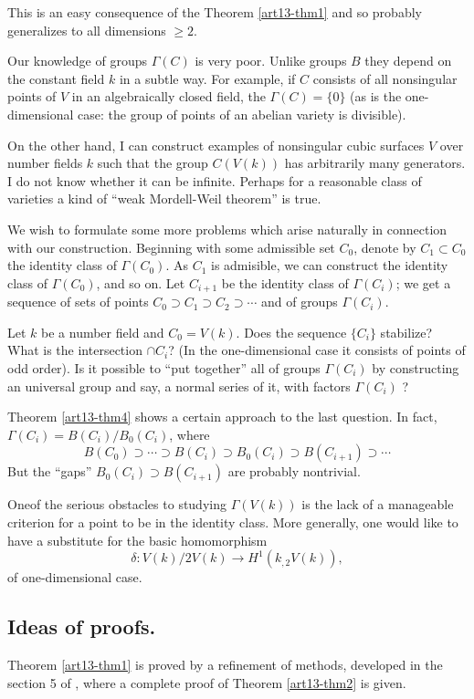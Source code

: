 This is an easy consequence of the Theorem \ref{art13-thm1} and so probably generalizes to all dimensions $\geq 2$.

Our knowledge of groups $\Gamma(C)$ is very poor. Unlike groups $B$ they depend on the constant field $k$ in a subtle way. For example, if $C$ consists of all nonsingular points of $V$ in an algebraically closed field, the $\Gamma(C)=\{0\}$ (as is the one-dimensional case: the group of points of an abelian variety is divisible).

On the other hand, I can construct examples of nonsingular cubic surfaces $V$ over number fields $k$ such that the group $C(V(k))$ has arbitrarily many generators. I do not know whether it can be infinite. Perhaps for a reasonable class of varieties a kind of ``weak Mordell-Weil theorem'' is true.

We wish to formulate some more problems which arise naturally in connection with our construction. Beginning with some admissible set $C_{0}$, denote by $C_{1}\subset C_{0}$ the identity class of $\Gamma(C_{0})$. As $C_{1}$ is admisible, we can construct the identity class of $\Gamma(C_{0})$, and so on. Let $C_{i+1}$ be the identity class of $\Gamma(C_{i})$; we get a sequence of sets of points $C_{0}\supset C_{1}\supset C_{2}\supset \cdots$ and of groups $\Gamma(C_{i})$.

Let $k$ be a number field and $C_{0}=V(k)$. Does the sequence $\{C_{i}\}$ stabilize? What is the intersection $\cap C_{i}$? (In the one-dimensional case it consists of points of odd order). Is it possible to ``put together'' all of groups $\Gamma(C_{i})$ by constructing an universal group and say, a normal series of it, with factors $\Gamma(C_{i})$ ?

Theorem \ref{art13-thm4} shows a certain approach to the last question. In fact, $\Gamma(C_{i})=B(C_{i})/B_{0}(C_{i})$, where
$$
B(C_{0})\supset\cdots\supset B(C_{i})\supset B_{0}(C_{i})\supset B(C_{i+1})\supset \cdots
$$
But the ``gaps'' $B_{0}(C_{i})\supset B(C_{i+1})$ are probably nontrivial.

One\pageoriginale of the serious obstacles to studying $\Gamma(V(k))$ is the lack of a manageable criterion for a point to be in the identity class. More generally, one would like to have a substitute for the basic homomorphism
$$
\delta : V(k)/2V(k)\to H^{1}(k_{,2}V(k)),
$$
of one-dimensional case.

\subsection*{Ideas of proofs.}
Theorem \ref{art13-thm1} is proved by a refinement of methods, developed in the section 5 of \cite{art13-key2}, where a complete proof of Theorem \ref{art13-thm2} is given.


